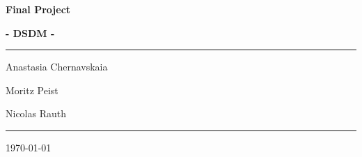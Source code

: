 \documentclass[12pt]{article}
\begin{document}
\begin{titlepage}
	\centering
	\par\vspace{0.75cm}
	{\huge\bfseries Final Project\par}
    {\large\bfseries \cl - DSDM -~\gr\par}
	\vspace{0.25cm}
    \noindent\rule{\textwidth}{1pt}
    {\Large Anastasia Chernavskaia\par}
	{\Large Moritz Peist\par}
    {\Large Nicolas Rauth\par}
    \noindent\rule{\textwidth}{1pt}
	\vfill
    \tableofcontents
    \vfill
	{\large \today\par}
\end{titlepage}





\newpage

\end{document}
